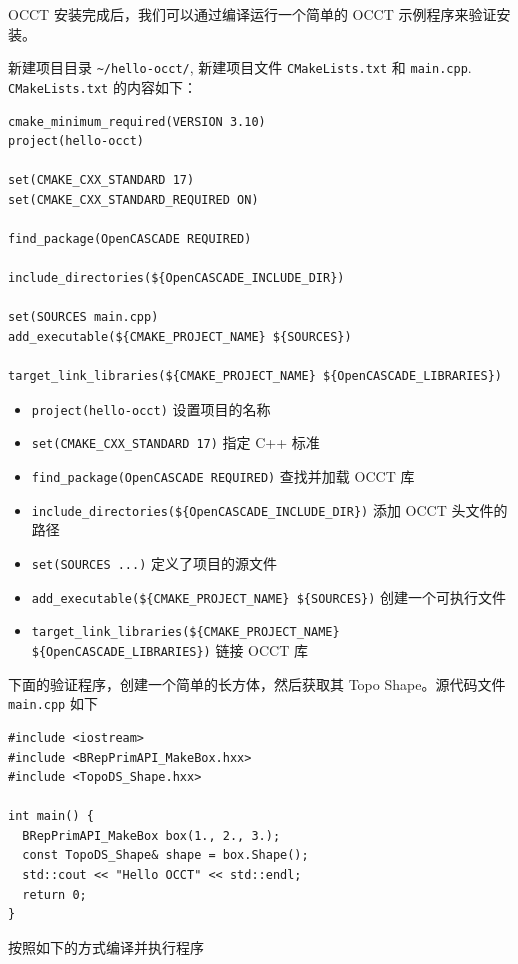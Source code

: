 \documentclass[11pt]{article}
\begin{document}
OCCT 安装完成后，我们可以通过编译运行一个简单的 OCCT 示例程序来验证安装。

新建项目目录 \texttt{\textasciitilde{}/hello-occt/}, 新建项目文件 \texttt{CMakeLists.txt} 和 \texttt{main.cpp}. \texttt{CMakeLists.txt} 的内容如下：

\begin{verbatim}
cmake_minimum_required(VERSION 3.10)
project(hello-occt)

set(CMAKE_CXX_STANDARD 17)
set(CMAKE_CXX_STANDARD_REQUIRED ON)

find_package(OpenCASCADE REQUIRED)

include_directories(${OpenCASCADE_INCLUDE_DIR})

set(SOURCES main.cpp)
add_executable(${CMAKE_PROJECT_NAME} ${SOURCES})

target_link_libraries(${CMAKE_PROJECT_NAME} ${OpenCASCADE_LIBRARIES})
\end{verbatim}

\begin{itemize}
\item \texttt{project(hello-occt)} 设置项目的名称
\item \texttt{set(CMAKE\_CXX\_STANDARD 17)} 指定 C++ 标准
\item \texttt{find\_package(OpenCASCADE REQUIRED)} 查找并加载 OCCT 库
\item \texttt{include\_directories(\$\{OpenCASCADE\_INCLUDE\_DIR\})} 添加 OCCT 头文件的路径
\item \texttt{set(SOURCES ...)} 定义了项目的源文件
\item \texttt{add\_executable(\$\{CMAKE\_PROJECT\_NAME\} \$\{SOURCES\})} 创建一个可执行文件
\item \texttt{target\_link\_libraries(\$\{CMAKE\_PROJECT\_NAME\} \$\{OpenCASCADE\_LIBRARIES\})} 链接 OCCT 库
\end{itemize}

下面的验证程序，创建一个简单的长方体，然后获取其 Topo Shape。源代码文件 \texttt{main.cpp} 如下

\begin{verbatim}
#include <iostream>
#include <BRepPrimAPI_MakeBox.hxx>
#include <TopoDS_Shape.hxx>

int main() {
  BRepPrimAPI_MakeBox box(1., 2., 3.);
  const TopoDS_Shape& shape = box.Shape();
  std::cout << "Hello OCCT" << std::endl;
  return 0;
}
\end{verbatim}

按照如下的方式编译并执行程序
\end{document}
